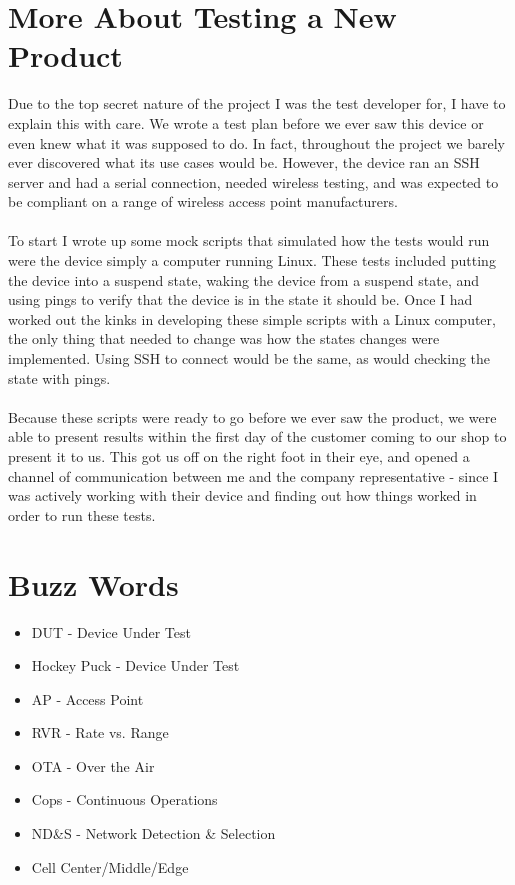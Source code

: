 \documentclass{article}
\begin{document}
\section*{More About Testing a New Product}
Due to the top secret nature of the project I was the test developer for, I have
to explain this with care. We wrote a test plan before we ever saw this device
or even knew what it was supposed to do. In fact, throughout the project we
barely ever discovered what its use cases would be. However, the device ran an
SSH server and had a serial connection, needed wireless testing, and was
expected to be compliant on a range of wireless access point manufacturers.\\
\\
To start I wrote up some mock scripts that simulated how the tests would
run were the device simply a computer running Linux. These tests included
putting the device into a suspend state, waking the device from a
suspend state, and using pings to verify that the device is in the state it
should be. Once I had worked out the kinks in developing these simple scripts
with a Linux computer, the only thing that needed to change was how the states
changes were implemented. Using SSH to connect would be the same, as would 
checking the state with pings.\\
\\
Because these scripts were ready to go before we ever saw the product, we were
able to present results within the first day of the customer coming to our shop
to present it to us. This got us off on the right foot in their eye, and opened
a channel of communication between me and the company representative - since I
was actively working with their device and finding out how things worked in
order to run these tests.

\section*{Buzz Words}
\begin{itemize}
\item DUT - Device Under Test
\item Hockey Puck - Device Under Test
\item AP - Access Point
\item RVR - Rate vs. Range
\item OTA - Over the Air
\item Cops - Continuous Operations
\item ND\&S - Network Detection \& Selection
\item Cell Center/Middle/Edge
\end{itemize}
\end{document}
